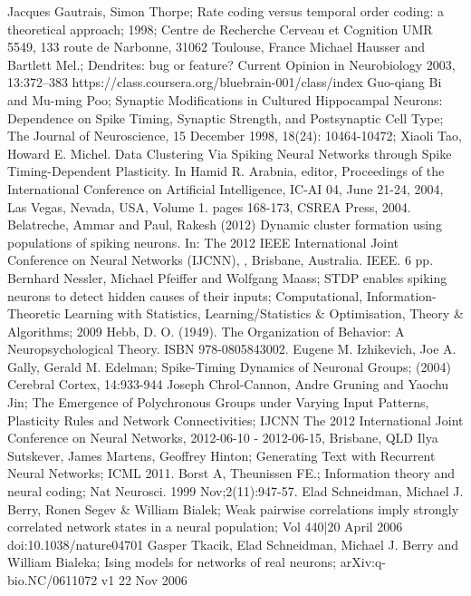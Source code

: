 \documentclass[a4paper,10pt]{article}
\begin{document}
\begin{thebibliography}{9}
Jacques Gautrais, Simon Thorpe; Rate coding versus temporal order coding: a theoretical approach; 1998; Centre de Recherche Cerveau et Cognition UMR 5549, 133 route de Narbonne, 31062 Toulouse, France
Michael Hausser and Bartlett Mel.; Dendrites: bug or feature? Current Opinion in Neurobiology 2003, 13:372–383
https://class.coursera.org/bluebrain-001/class/index
Guo-qiang Bi and Mu-ming Poo; Synaptic Modifications in Cultured Hippocampal Neurons: Dependence on Spike Timing, Synaptic Strength, and Postsynaptic Cell Type; The Journal of Neuroscience, 15 December 1998, 18(24): 10464-10472;
Xiaoli Tao, Howard E. Michel. Data Clustering Via Spiking Neural Networks through Spike Timing-Dependent Plasticity. In Hamid R. Arabnia, editor, Proceedings of the International Conference on Artificial Intelligence, IC-AI 04, June 21-24, 2004, Las Vegas, Nevada, USA, Volume 1. pages 168-173, CSREA Press, 2004.
Belatreche, Ammar and Paul, Rakesh (2012) Dynamic cluster formation using populations of spiking neurons. In: The 2012 IEEE International Joint Conference on Neural Networks (IJCNN), , Brisbane, Australia. IEEE. 6 pp.
Bernhard Nessler, Michael Pfeiffer and Wolfgang Maass; STDP enables spiking neurons to detect hidden causes of their inputs; Computational, Information-Theoretic Learning with Statistics, Learning/Statistics \& Optimisation, Theory \& Algorithms; 2009
Hebb, D. O. (1949). The Organization of Behavior: A Neuropsychological Theory. ISBN 978-0805843002.
Eugene M. Izhikevich, Joe A. Gally, Gerald M. Edelman; Spike-Timing Dynamics of Neuronal Groups; (2004) Cerebral Cortex, 14:933-944
Joseph Chrol-Cannon, Andre Gruning and Yaochu Jin; The Emergence of Polychronous Groups under Varying Input Patterns, Plasticity Rules and Network Connectivities; IJCNN The 2012 International Joint Conference on Neural Networks, 2012-06-10 - 2012-06-15, Brisbane, QLD
Ilya Sutskever, James Martens, Geoffrey Hinton; Generating Text with Recurrent Neural Networks; ICML 2011. 
Borst A, Theunissen FE.; Information theory and neural coding; Nat Neurosci. 1999 Nov;2(11):947-57.
Elad Schneidman, Michael J. Berry, Ronen Segev \& William Bialek; Weak pairwise correlations imply strongly correlated network states in a neural population; Vol 440|20 April 2006 doi:10.1038/nature04701
Gasper Tkacik, Elad Schneidman, Michael J. Berry and William Bialeka; Ising models for networks of real neurons; arXiv:q-bio.NC/0611072 v1 22 Nov 2006



\end{thebibliography}
\end{document}
